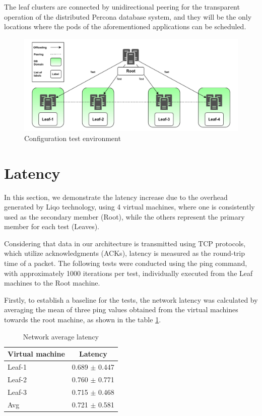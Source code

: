 The leaf clusters are connected by unidirectional peering for the transparent operation of the distributed Percona database system, and they will be the only locations where the pods of the aforementioned applications can be scheduled.

\begin{figure}[ht]\centering
\includegraphics[scale=0.5]{Pictures/test}
\caption{Configuration test environment}\label{graph:test}
\end{figure}

\section{Latency}
In this section, we demonstrate the latency increase due to the overhead generated by Liqo technology, using 4 virtual machines, where one is consistently used as the secondary member (Root), while the others represent the primary member for each test (Leaves).

Considering that data in our architecture is transmitted using TCP protocols, which utilize acknowledgments (ACKs), latency is measured as the round-trip time of a packet. The following tests were conducted using the ping command, with approximately 1000 iterations per test, individually executed from the Leaf machines to the Root machine.

Firstly, to establish a baseline for the tests, the network latency was calculated by averaging the mean of three ping values obtained from the virtual machines towards the root machine, as shown in the table \ref{t:2}.

\begin{table}[ht]              
\centering 
\begin{tabular}{|l|c|}
\hline
\textbf{Virtual machine} & \textbf{Latency}  \\ 
\hline
Leaf-1 & 0.689 $\pm$ 0.447  \\
\hline
Leaf-2 & 0.760 $\pm$ 0.771 \\
\hline
Leaf-3 & 0.715 $\pm$ 0.468 \\
\hline
Avg & 0.721 $\pm$ 0.581 \\
\hline
\end{tabular}
\caption[Network average latency ]{Network average latency} \label{t:2}  
\end{table}

